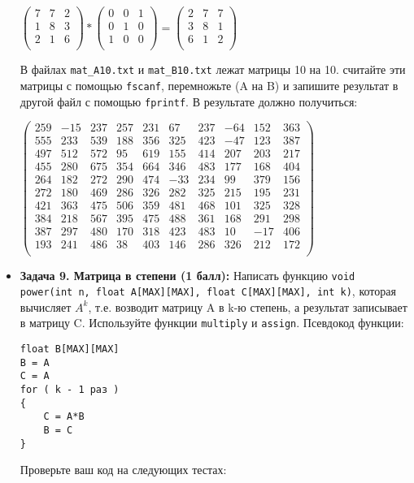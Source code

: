 \documentclass{article}
\begin{document}
\begin{itemize}
\begin{center}

$
\begin{pmatrix}
7 & 7 & 2 \\
1 & 8 & 3 \\
2 & 1 & 6 \\
\end{pmatrix} *
\begin{pmatrix}
0 & 0 & 1 \\
0 & 1 & 0 \\
1 & 0 & 0 \\
\end{pmatrix}
=
\begin{pmatrix}
2 & 7 & 7 \\
3 & 8 & 1 \\
6 & 1 & 2 \\
\end{pmatrix}
$
\end{center}
В файлах \texttt{mat\_A10.txt} и \texttt{mat\_B10.txt} лежат матрицы 10 на 10. считайте эти матрицы с помощью \texttt{fscanf}, перемножьте (A на B) и запишите результат в другой файл с помощью \texttt{fprintf}. В результате должно получиться:
\begin{center}
$
\begin{pmatrix}
259 & -15 & 237 & 257 &  231 &  67  & 237  & -64  & 152  & 363 \\
555 & 233 & 539 & 188 &  356 &  325 &  423 &  -47 &  123 &  387 \\
497 & 512 & 572 & 95  & 619  & 155  & 414  & 207  & 203  & 217 \\
455 & 280 & 675 & 354 &  664 &  346 &  483 &  177 &  168 &  404 \\
264 & 182 & 272 & 290 &  474 &  -33 &  234 &  99  & 379  & 156 \\
272 & 180 & 469 & 286 &  326 &  282 &  325 &  215 &  195 &  231 \\
421 & 363 & 475 & 506 &  359 &  481 &  468 &  101 &  325 &  328 \\
384 & 218 & 567 & 395 &  475 &  488 &  361 &  168 &  291 &  298 \\
387 & 297 & 480 & 170 &  318 &  423 &  483 &  10  & -17  & 406 \\
193 & 241 & 486 & 38  & 403  & 146  & 286  & 326  & 212  & 172 \\
\end{pmatrix}
$
\end{center}

\item \textbf{Задача 9. Матрица в степени (1 балл):} Написать функцию \texttt{void power(int n, float A[MAX][MAX], float C[MAX][MAX], int k)}, которая вычисляет $A^k$, т.е. возводит матрицу A в k-ю степень, а результат записывает в матрицу C. Используйте функции \texttt{multiply} и \texttt{assign}. Псевдокод функции:
\begin{lstlisting}
float B[MAX][MAX]
B = A
C = A
for ( k - 1 раз )
{
	C = A*B
	B = C
}
\end{lstlisting}
Проверьте ваш код на следующих тестах:
\begin{center}


\end{center}
\end{itemize}
\end{document}
